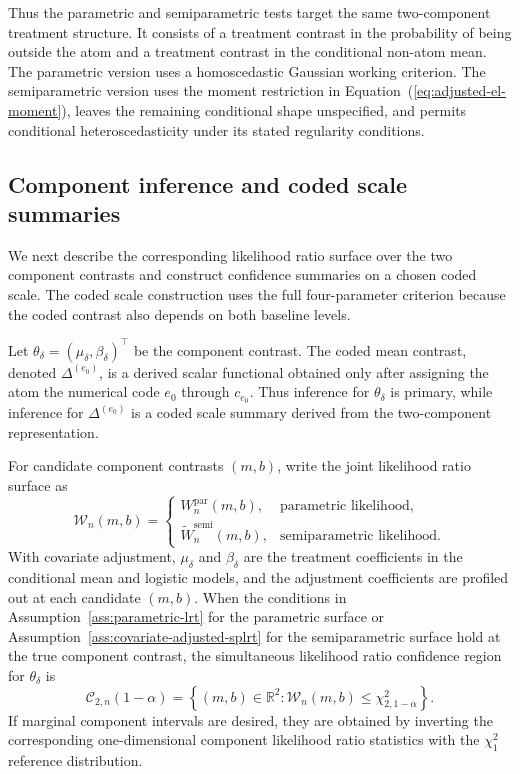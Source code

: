 \documentclass[11pt]{article}
\begin{document}
Thus the parametric and semiparametric tests target the same two-component treatment structure. It consists of a treatment contrast in the probability of being outside the atom and a treatment contrast in the conditional non-atom mean. The parametric version uses a homoscedastic Gaussian working criterion. The semiparametric version uses the moment restriction in Equation~(\ref{eq:adjusted-el-moment}), leaves the remaining conditional shape unspecified, and permits conditional heteroscedasticity under its stated regularity conditions.


\subsection{Component inference and coded scale summaries}

We next describe the corresponding likelihood ratio surface over the two component contrasts and construct confidence summaries on a chosen coded scale. The coded scale construction uses the full four-parameter criterion because the coded contrast also depends on both baseline levels.

Let $\theta_\delta=(\mu_\delta,\beta_\delta)^\top$ be the component contrast. The coded mean contrast, denoted $\Delta^{(e_0)}$, is a derived scalar functional obtained only after assigning the atom the numerical code $e_0$ through $c_{e_0}$. Thus inference for $\theta_\delta$ is primary, while inference for $\Delta^{(e_0)}$ is a coded scale summary derived from the two-component representation.

For candidate component contrasts $(m,b)$, write the joint likelihood ratio surface as
\begin{equation*}
  \mathcal{W}_n(m,b)
  =
  \begin{cases}
    W_n^{\mathrm{par}}(m,b), & \text{parametric likelihood},\\[0.4em]
    \widetilde{W}_n^{\mathrm{semi}}(m,b), & \text{semiparametric likelihood}.
  \end{cases}
\end{equation*}
With covariate adjustment, $\mu_\delta$ and $\beta_\delta$ are the treatment coefficients in the conditional mean and logistic models, and the adjustment coefficients are profiled out at each candidate $(m,b)$.
When the conditions in Assumption~\ref{ass:parametric-lrt} for the parametric surface or Assumption~\ref{ass:covariate-adjusted-splrt} for the semiparametric surface hold at the true component contrast, the simultaneous likelihood ratio confidence region for $\theta_\delta$ is
\begin{equation*}
  \mathcal{C}_{2,n}(1-\alpha)
  =
  \left\{
    (m,b)\in\mathbb{R}^2:
    \mathcal{W}_n(m,b)\leq\chi^2_{2,1-\alpha}
  \right\}.
\end{equation*}
If marginal component intervals are desired, they are obtained by inverting the corresponding one-dimensional component likelihood ratio statistics with the $\chi^2_1$ reference distribution.
\end{document}
